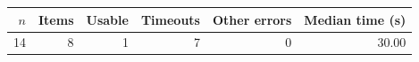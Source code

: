 \begin{tabular}{rrrrrr}
\toprule
$n$ & Items & Usable & Timeouts & Other errors & Median time (s) \\
\midrule
14 & 8 & 1 & 7 & 0 & 30.00 \\
\bottomrule
\end{tabular}
